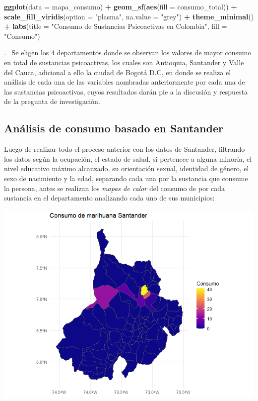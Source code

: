 \documentclass[
]{article}
\newenvironment{Shaded}{\begin{snugshade}}{\end{snugshade}}
\newcommand{\AttributeTok}[1]{\textcolor[rgb]{0.13,0.29,0.53}{#1}}
\newcommand{\FunctionTok}[1]{\textcolor[rgb]{0.13,0.29,0.53}{\textbf{#1}}}
\newcommand{\NormalTok}[1]{#1}
\newcommand{\SpecialCharTok}[1]{\textcolor[rgb]{0.81,0.36,0.00}{\textbf{#1}}}
\newcommand{\StringTok}[1]{\textcolor[rgb]{0.31,0.60,0.02}{#1}}
\begin{document}
\begin{Shaded}
\begin{Highlighting}[]
\FunctionTok{ggplot}\NormalTok{(}\AttributeTok{data =}\NormalTok{ mapa\_consumo) }\SpecialCharTok{+}
  \FunctionTok{geom\_sf}\NormalTok{(}\FunctionTok{aes}\NormalTok{(}\AttributeTok{fill =}\NormalTok{ consumo\_total)) }\SpecialCharTok{+}
  \FunctionTok{scale\_fill\_viridis}\NormalTok{(}\AttributeTok{option =} \StringTok{"plasma"}\NormalTok{, }\AttributeTok{na.value =} \StringTok{"grey"}\NormalTok{) }\SpecialCharTok{+}
  \FunctionTok{theme\_minimal}\NormalTok{() }\SpecialCharTok{+}
  \FunctionTok{labs}\NormalTok{(}\AttributeTok{title =} \StringTok{"Consumo de Sustancias Psicoactivas en Colombia"}\NormalTok{,}
       \AttributeTok{fill =} \StringTok{"Consumo"}\NormalTok{)}
\end{Highlighting}
\end{Shaded}

\hfill{}.~ Se eligen los 4 departamentos donde se observan los valores de
mayor consumo en total de sustancias psicoactivas, los cuales son
Antioquia, Santander y Valle del Cauca, adicional a ello la ciudad de
Bogotá D.C, en donde se realiza el análisis de cada una de las variables
nombradas anteriormente por cada una de las sustancias psicoactivas,
cuyos resultados darán pie a la discusión y respuesta de la pregunta de
investigación.

\subsection{Análisis de consumo basado en
Santander}\label{anuxe1lisis-de-consumo-basado-en-santander}

Luego de realizar todo el proceso anterior con los datos de Santander,
filtrando los datos según la ocupación, el estado de salud, si pertenece
a alguna minoría, el nivel educativo máximo alcanzado, su orientación
sexual, identidad de género, el sexo de nacimiento y la edad, separando
cada una por la sustancia que consume la persona, antes se realizan los
\emph{mapas de calor} del consumo de por cada sustancia en el
departamento analizando cada uno de sus municipios:

\includegraphics{images/Mapa de consumo de marihuana en santander.png}
\end{document}
